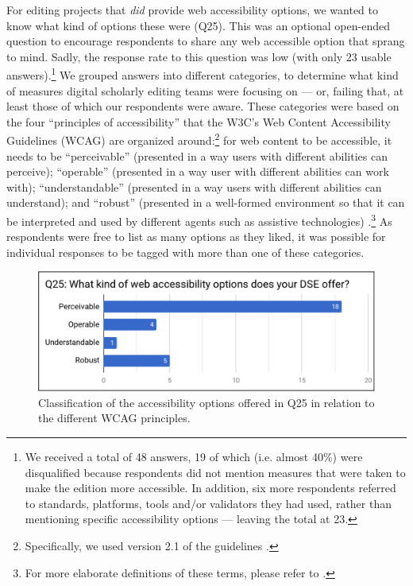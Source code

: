 \begin{paper}
For editing projects that \emph{did} provide web accessibility options,
we wanted to know what kind of options these were (Q25). This was an
optional open-ended question to encourage respondents to share any web
accessible option that sprang to mind. Sadly, the response rate to this
question was low (with only 23 usable answers).\footnote{We received a
  total of 48 answers, 19 of which (i.e. almost 40\%) were disqualified
  because respondents did not mention measures that were taken to make
  the edition more accessible. In addition, six more respondents
  referred to standards, platforms, tools and/or validators they had
  used, rather than mentioning specific accessibility options --- leaving
  the total at 23.} We grouped answers into different categories, to
determine what kind of measures digital scholarly editing teams were
focusing on --- or, failing that, at least those of which our respondents
were aware. These categories were based on the four ``principles of
accessibility'' that the W3C's Web Content Accessibility Guidelines
(WCAG) are organized around:\footnote{Specifically, we used version 2.1
  of the guidelines \citep[see][]{w3c_web_2018}.}
for web content to be accessible, it needs to be ``perceivable''
(presented in a way users with different abilities can perceive);
``operable'' (presented in a way user with different abilities can work
with); ``understandable'' (presented in a way users with different
abilities can understand); and ``robust'' (presented in a well-formed
environment so that it can be interpreted and used by different agents
such as assistive technologies) \citep{w3c_introduction_2018}.\footnote{For
  more elaborate definitions of these terms, please refer to \citet{w3c_introduction_2018}.}
As respondents were free to list as many options as they liked, it was
possible for individual responses to be tagged with more than one of
these categories.

\begin{figure}[h!]
\includegraphics[width=\textwidth]{media/martinez4.png}
\caption{Classification of the accessibility options offered in
Q25 in relation to the different WCAG principles.}
\label{q25}
\end{figure}


\end{paper}
